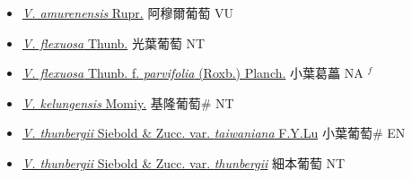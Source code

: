 \begin{itemize}
  \begin{itemize}
        \item[] \href{http://www.theplantlist.org/tpl1.1/search?q=Vitis+amurenensis}{\textit{V. amurenensis} Rupr.}   阿穆爾葡萄 VU
        \item[] \href{http://www.theplantlist.org/tpl1.1/search?q=Vitis+flexuosa}{\textit{V. flexuosa} Thunb.}   光葉葡萄 NT
        \item[] \href{http://www.theplantlist.org/tpl1.1/search?q=Vitis+flexuosa+ f. +parvifolia}{\textit{V. flexuosa} Thunb.  f.  \textit{parvifolia} (Roxb.) Planch.}   小葉葛藟 NA $^f$
        \item[] \href{http://www.theplantlist.org/tpl1.1/search?q=Vitis+kelungensis}{\textit{V. kelungensis} Momiy.}   基隆葡萄\# NT
        \item[] \href{http://www.theplantlist.org/tpl1.1/search?q=Vitis+thunbergii+var.+taiwaniana}{\textit{V. thunbergii} Siebold \& Zucc. var. \textit{taiwaniana} F.Y.Lu}   小葉葡萄\# EN
        \item[] \href{http://www.theplantlist.org/tpl1.1/search?q=Vitis+thunbergii+var.+thunbergii}{\textit{V. thunbergii} Siebold \& Zucc. var. \textit{thunbergii}}   細本葡萄 NT
  \end{itemize}
  \end{itemize}
